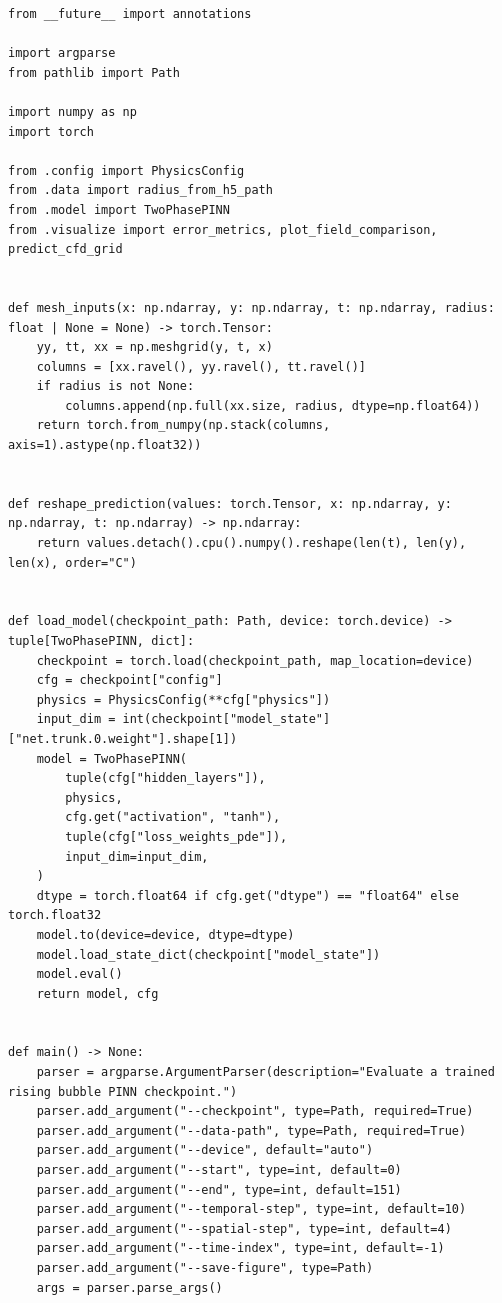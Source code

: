 \bigskip
{}
\nopagebreak
\begin{lstlisting}
from __future__ import annotations

import argparse
from pathlib import Path

import numpy as np
import torch

from .config import PhysicsConfig
from .data import radius_from_h5_path
from .model import TwoPhasePINN
from .visualize import error_metrics, plot_field_comparison, predict_cfd_grid


def mesh_inputs(x: np.ndarray, y: np.ndarray, t: np.ndarray, radius: float | None = None) -> torch.Tensor:
    yy, tt, xx = np.meshgrid(y, t, x)
    columns = [xx.ravel(), yy.ravel(), tt.ravel()]
    if radius is not None:
        columns.append(np.full(xx.size, radius, dtype=np.float64))
    return torch.from_numpy(np.stack(columns, axis=1).astype(np.float32))


def reshape_prediction(values: torch.Tensor, x: np.ndarray, y: np.ndarray, t: np.ndarray) -> np.ndarray:
    return values.detach().cpu().numpy().reshape(len(t), len(y), len(x), order="C")


def load_model(checkpoint_path: Path, device: torch.device) -> tuple[TwoPhasePINN, dict]:
    checkpoint = torch.load(checkpoint_path, map_location=device)
    cfg = checkpoint["config"]
    physics = PhysicsConfig(**cfg["physics"])
    input_dim = int(checkpoint["model_state"]["net.trunk.0.weight"].shape[1])
    model = TwoPhasePINN(
        tuple(cfg["hidden_layers"]),
        physics,
        cfg.get("activation", "tanh"),
        tuple(cfg["loss_weights_pde"]),
        input_dim=input_dim,
    )
    dtype = torch.float64 if cfg.get("dtype") == "float64" else torch.float32
    model.to(device=device, dtype=dtype)
    model.load_state_dict(checkpoint["model_state"])
    model.eval()
    return model, cfg


def main() -> None:
    parser = argparse.ArgumentParser(description="Evaluate a trained rising bubble PINN checkpoint.")
    parser.add_argument("--checkpoint", type=Path, required=True)
    parser.add_argument("--data-path", type=Path, required=True)
    parser.add_argument("--device", default="auto")
    parser.add_argument("--start", type=int, default=0)
    parser.add_argument("--end", type=int, default=151)
    parser.add_argument("--temporal-step", type=int, default=10)
    parser.add_argument("--spatial-step", type=int, default=4)
    parser.add_argument("--time-index", type=int, default=-1)
    parser.add_argument("--save-figure", type=Path)
    args = parser.parse_args()


\end{lstlisting}
